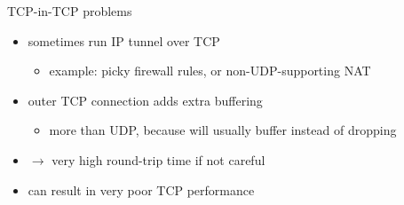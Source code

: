 \begin{frame}{TCP-in-TCP problems}
    \begin{itemize}
    \item sometimes run IP tunnel over TCP
        \begin{itemize}
        \item example: picky firewall rules, or non-UDP-supporting NAT
        \end{itemize}
    \item outer TCP connection adds extra buffering
        \begin{itemize}
        \item more than UDP, because will usually buffer instead of dropping
        \end{itemize}
    \vspace{.5cm}
    \item $\rightarrow$ very high round-trip time if not careful
    \item can result in very poor TCP performance
    \end{itemize}
\end{frame}
